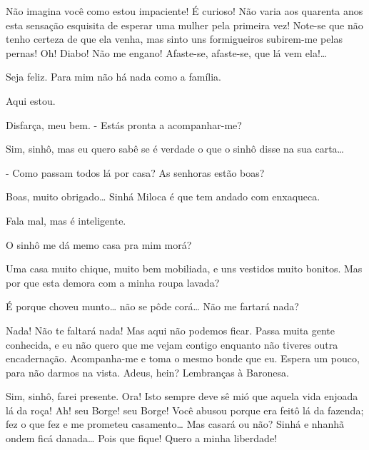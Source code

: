   Não
imagina você como estou impaciente! É curioso! Não varia aos quarenta anos
esta sensação esquisita de esperar uma mulher pela primeira vez! Note-se que não
tenho certeza de que ela venha, mas sinto uns formigueiros subirem-me pelas
pernas!  Oh! Diabo! Não me engano! Afaste-se, afaste-se, que lá
vem ela!\ldots{}

 Seja feliz. Para mim não há nada como a família. 


  Aqui estou.

  Disfarça, meu bem. 
- Estás pronta a acompanhar-me?

  Sim, sinhô, mas eu
quero sabê se é verdade o que o sinhô disse na sua carta\ldots{}

  -
Como passam todos lá por casa? As senhoras estão boas?

  Boas, muito obrigado\ldots{} Sinhá Miloca é que tem
andado com enxaqueca.

  Fala mal, mas é inteligente.

 O sinhô me dá memo casa pra mim morá?

 Uma casa muito chique, muito bem mobiliada, e uns vestidos
muito bonitos.  Mas por que esta
demora com a minha roupa lavada?

 É porque choveu munto\ldots{} não se pôde corá\ldots{}  Não me
fartará nada?

 Nada! Não te faltará nada! Mas aqui não podemos ficar. Passa
muita gente conhecida, e eu não quero que me vejam contigo enquanto não tiveres
outra encadernação. Acompanha-me e toma o mesmo bonde que eu.  Espera um pouco, para não darmos na vista.
 Adeus, hein? Lembranças à Baronesa.

 Sim, sinhô, farei presente.  Ora! Isto sempre deve sê mió que aquela vida enjoada
lá da roça! Ah! seu Borge! seu Borge! Você abusou porque era feitô lá da fazenda;
fez o que fez e me prometeu casamento\ldots{} Mas casará ou não? Sinhá e nhanhã ondem
ficá danada\ldots{} Pois que fique! Quero a minha liberdade! 

